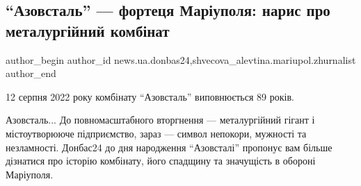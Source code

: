  
 
 
 
 
 
\subsection{\enquote{Азовсталь} — фортеця Маріуполя: нарис про металургійний комбінат}
\label{sec:12_08_2022.stz.news.ua.donbas24.1.azovstal_fortecja_mrpl_narys_metalurg_kombinat}
 
\ifcmt
 author_begin
   author_id news.ua.donbas24,shvecova_alevtina.mariupol.zhurnalist
 author_end
\fi


12 серпня 2022 року комбінату \enquote{Азовсталь} виповнюється 89 років.

Азовсталь... До повномасштабного вторгнення — металургійний гігант і
містоутворююче підприємство, зараз — символ непокори, мужності та незламності.
Донбас24 до дня народження \enquote{Азовсталі} пропонує вам більше дізнатися про
історію комбінату, його спадщину та значущість в обороні Маріуполя.





